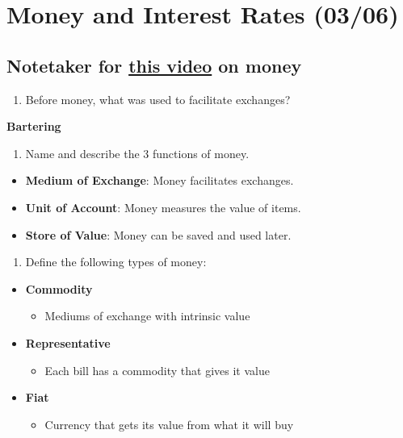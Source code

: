 \documentclass[
  letterpaper,
  DIV=11,
  numbers=noendperiod]{scrartcl}
\providecommand{\tightlist}{%
  \setlength{\itemsep}{0pt}\setlength{\parskip}{0pt}}\usepackage{longtable,booktabs,array}
\begin{document}
\newpage{}

\section{Money and Interest Rates
(03/06)}\label{money-and-interest-rates-0306}

\subsection{\texorpdfstring{Notetaker for
\href{https://www.youtube.com/watch?v=9ZJUkSePNLw}{this video} on
money}{Notetaker for this video on money}}\label{notetaker-for-this-video-on-money}

\begin{enumerate}
\def\labelenumi{\arabic{enumi}.}
\tightlist
\item
  Before money, what was used to facilitate exchanges?
\end{enumerate}

\textbf{Bartering}

\begin{enumerate}
\def\labelenumi{\arabic{enumi}.}
\setcounter{enumi}{1}
\tightlist
\item
  Name and describe the 3 functions of money.
\end{enumerate}

\begin{itemize}
\tightlist
\item
  \textbf{Medium of Exchange}: Money facilitates exchanges.
\item
  \textbf{Unit of Account}: Money measures the value of items.
\item
  \textbf{Store of Value}: Money can be saved and used later.
\end{itemize}

\begin{enumerate}
\def\labelenumi{\arabic{enumi}.}
\setcounter{enumi}{2}
\tightlist
\item
  Define the following types of money:
\end{enumerate}

\begin{itemize}
\tightlist
\item
  \textbf{Commodity}

  \begin{itemize}
  \tightlist
  \item
    Mediums of exchange with intrinsic value
  \end{itemize}
\item
  \textbf{Representative}

  \begin{itemize}
  \tightlist
  \item
    Each bill has a commodity that gives it value
  \end{itemize}
\item
  \textbf{Fiat}

  \begin{itemize}
  \tightlist
  \item
    Currency that gets its value from what it will buy
  \end{itemize}
\end{itemize}
\end{document}
